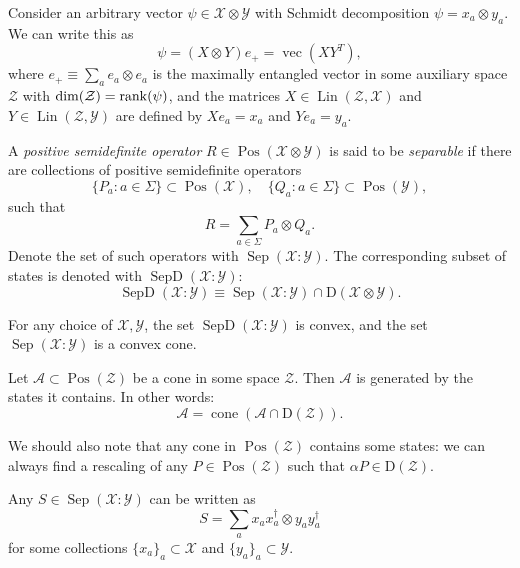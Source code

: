 \documentclass[12pt]{report}
\newcommand{\on}[1]{\operatorname{#1}}
\newcommand{\calA}{{\mathcal{A}}}
\newcommand{\calY}{{\mathcal{Y}}}
\newcommand{\calX}{{\mathcal{X}}}
\newcommand{\calZ}{{\mathcal{Z}}}
\newcommand{\rmD}{{\mathrm{D}}}
\DeclareMathOperator{\Pos}{Pos}
\DeclareMathOperator{\Lin}{Lin}
\begin{document}
Consider an arbitrary vector $\psi\in\calX\otimes\calY$ with Schmidt decomposition
$\psi=x_a\otimes y_a$. We can write this as
\begin{equation}
	\psi = (X\otimes Y) e_+ = \on{vec}(XY^T),
\end{equation}
where $e_+\equiv\sum_a e_a\otimes e_a$ is the maximally entangled vector in some auxiliary space $\calZ$ with $\dim(\calZ)=\rank(\psi)$, and the matrices $X\in\Lin(\calZ,\calX)$ and $Y\in\Lin(\calZ,\calY)$ are defined by
$X e_a=x_a$ and $Y e_a=y_a$.

\begin{defn}
	A \emph{positive semidefinite operator} $R\in\Pos(\calX\otimes\calY)$ is said to be \emph{separable} if there are collections of positive semidefinite operators
	\begin{equation}
		\{P_a : a \in\Sigma\} \subset\Pos(\calX),
		\quad
		\{Q_a : a \in\Sigma\} \subset\Pos(\calY),
	\end{equation}
	such that
	\begin{equation}
		R = \sum_{a\in\Sigma} P_a \otimes Q_a.
	\end{equation}
	Denote the set of such operators with $\on{Sep}(\calX:\calY)$.
	The corresponding subset of states is denoted with $\on{SepD}(\calX:\calY)$:
	\begin{equation}
		\on{SepD}(\calX:\calY) \equiv \on{Sep}(\calX:\calY)\cap \rmD(\calX\otimes\calY).
	\end{equation}
\end{defn}

\begin{prop}
	For any choice of $\calX,\calY$, the set
	$\on{SepD}(\calX:\calY)$ is convex, and the set
	$\on{Sep}(\calX:\calY)$ is a convex cone.
\end{prop}

\begin{prop}
	Let $\calA\subset\Pos(\calZ)$ be a cone in some space $\calZ$. Then $\calA$ is generated by the states it contains. In other words:
	\begin{equation}
		\calA = \on{cone}(\calA\cap \rmD(\calZ)).
	\end{equation}
\end{prop}
We should also note that any cone in $\Pos(\calZ)$ contains some states: we can always find a rescaling of any $P\in\Pos(\calZ)$ such that $\alpha P\in\rmD(\calZ)$.

\begin{prop}
	Any $S\in\on{Sep}(\calX:\calY)$ can be written as
	\begin{equation}
		S = \sum_a x_a x_a^\dagger\otimes y_a y_a^\dagger
	\end{equation}
	for some collections $\{x_a\}_a\subset\calX$ and $\{y_a\}_a\subset\calY$.
\end{prop}
\end{document}
